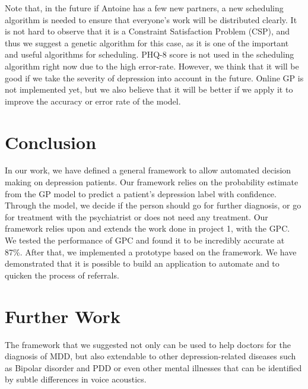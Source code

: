 \documentclass{article}
\begin{document}
	
    Note that, in the future if Antoine has a few new partners, a new scheduling algorithm is needed to ensure that everyone's work will be distributed clearly.
    It is not hard to observe that it is a Constraint Satisfaction Problem (CSP), and thus we suggest a genetic algorithm for this case, 
    as it is one of the important and useful algorithms for scheduling. 
    PHQ-8 score is not used in the scheduling algorithm right now due to the high error-rate. 
    However, we think that it will be good if we take the severity of depression into account in the future. 
    Online GP is not implemented yet, but we also believe that it will be better if we apply it to improve the accuracy or error rate of the model.
    
	
	\section{Conclusion}	
		In our work, we have defined a general framework to allow automated decision making on depression patients. Our framework relies on the probability estimate from the GP model to predict a patient's depression label with confidence. Through the model, we decide if the person should go for further diagnosis, or go for treatment with the psychiatrist or does not need any treatment. Our framework relies upon and extends the work done in project 1, with the GPC. We tested the performance of GPC and found it to be incredibly accurate at 87\%. After that, we implemented a prototype based on the framework. We have demonstrated that it is possible to build an application to automate and to quicken the process of referrals.
	
	\section{Further Work}
	The framework that we suggested not only can be used to help doctors for the diagnosis of MDD, but also extendable to other depression-related 
	diseases such as Bipolar disorder and PDD or even other mental illnesses that can be identified by subtle differences in voice acoustics. 

	
\end{document}

